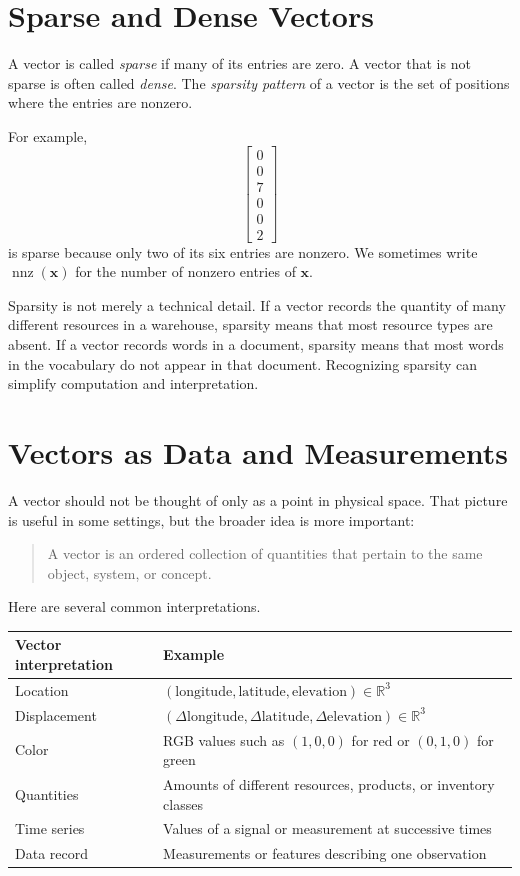 \section{Sparse and Dense Vectors}
\label{mf:sparse-vectors}

A vector is called \emph{sparse} if many of its entries are zero. A vector that is not sparse is often called \emph{dense}. The \emph{sparsity pattern} of a vector is the set of positions where the entries are nonzero.

For example,
\[
\begin{bmatrix}
0\\0\\7\\0\\0\\2
\end{bmatrix}
\]
is sparse because only two of its six entries are nonzero. We sometimes write \(\operatorname{nnz}(\mathbf{x})\) for the number of nonzero entries of \(\mathbf{x}\).

Sparsity is not merely a technical detail. If a vector records the quantity of many different resources in a warehouse, sparsity means that most resource types are absent. If a vector records words in a document, sparsity means that most words in the vocabulary do not appear in that document. Recognizing sparsity can simplify computation and interpretation.

\section{Vectors as Data and Measurements}
\label{mf:vectors-as-data}

A vector should not be thought of only as a point in physical space. That picture is useful in some settings, but the broader idea is more important:

\begin{quote}
A vector is an ordered collection of quantities that pertain to the same object, system, or concept.
\end{quote}

Here are several common interpretations.

\begin{center}
\begin{tabular}{p{} p{}}
\hline
Vector interpretation & Example \\
\hline
Location & \((\text{longitude},\text{latitude},\text{elevation})\in\mathbb{R}^3\) \\
Displacement & \((\Delta\text{longitude},\Delta\text{latitude},\Delta\text{elevation})\in\mathbb{R}^3\) \\
Color & RGB values such as \((1,0,0)\) for red or \((0,1,0)\) for green \\
Quantities & Amounts of different resources, products, or inventory classes \\
Time series & Values of a signal or measurement at successive times \\
Data record & Measurements or features describing one observation \\
\hline
\end{tabular}
\end{center}

